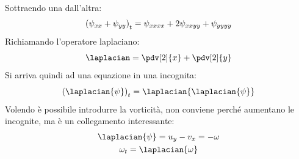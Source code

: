 %
Sottraendo una dall'altra:
	\begin{equation*}
		{\left( \psi_{xx} + \psi_{yy} \right)}_t  = \psi_{xxxx} + 2 \psi_{xxyy} + \psi_{yyyy}\\
	\end{equation*}
%
Richiamando l'operatore laplaciano:
%
	\begin{equation*}
		\laplacian = \pdv[2]{x} + \pdv[2]{y}
	\end{equation*}
%
Si arriva quindi ad una equazione in una incognita:
%
	\begin{equation*}
		{\left( \laplacian{\psi} \right)}_t = \laplacian{ \laplacian{ \psi } }
	\end{equation*}
%
Volendo è possibile introdurre la vorticità, non conviene perché aumentano le incognite, ma è un collegamento interessante:
%
	\begin{equation*}
		\begin{gathered}
			\laplacian{\psi} = u_y - v_x = - \omega\\
			\omega_t = \laplacian{ \omega }
		\end{gathered}
	\end{equation*}
%

